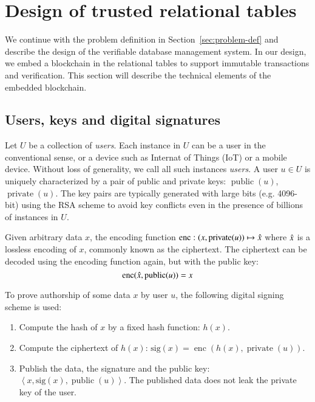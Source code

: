 \section{Design of trusted relational tables}
\label{sec:trusted-db}

We continue with the problem definition in
Section~\ref{sec:problem-def} and describe the design of the verifiable database
management system.  In our design, we embed a blockchain in the relational
tables to support immutable transactions and verification. This section will
describe the technical elements of the embedded blockchain.

\subsection{Users, keys and digital signatures}

\newcommand{\public}{\operatorname{public}}
\newcommand{\private}{\operatorname{private}}
\newcommand{\enc}{\operatorname{enc}}

Let $U$ be a collection of {\em users}.  Each instance in $U$ can be a user in
the conventional sense, or a device such as Internat of Things (IoT) or a mobile
device.  Without loss of generality, we call all such instances {\em users}.  A
user $u\in U$ is uniquely characterized by a pair of public and private keys:
$\public(u)$, $\private(u)$.  The key pairs are typically generated with large
bits (e.g. 4096-bit) using the RSA scheme \cite{cormen2009introduction} to avoid key conflicts
even in the presence of billions of instances in $U$.  

Given arbitrary data $x$, the encoding function 
$\enc: (x,\private(u))\mapsto \Hat{x}$ where $\Hat{x}$ is a lossless encoding
of $x$, commonly known as the ciphertext.  The ciphertext can be decoded using
the encoding function again, but with the public key:
$$ \enc(\Hat{x}, \public(u)) = x $$

To prove authorship of some data $x$ by user $u$, the following digital signing
scheme is used:

\begin{enumerate}
    \item Compute the hash of $x$ by a fixed hash function: $h(x)$.
    \item Compute the ciphertext of $h(x)$: $\mathrm{sig}(x) = \enc(h(x),
        \private(u))$.
    \item Publish the data, the signature and the public key:
        $\left<x, \mathrm{sig}(x), \public(u)\right>$.
        The published data does not leak the private key of the user.
\end{enumerate}

